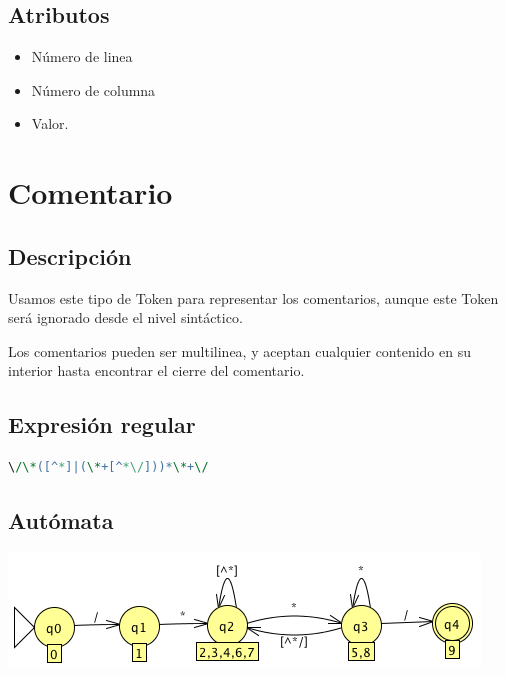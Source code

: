         \subsection{Atributos}
        
            \begin{itemize}
                \item Número de linea
                \item Número de columna
                \item Valor.
            \end{itemize}
            
            \hfill
            \clearpage
            
     
    
    \section{Comentario}
    
        \subsection{Descripción}
        
            Usamos este tipo de Token para representar los comentarios, aunque este Token será ignorado desde el nivel sintáctico.
            
            Los comentarios pueden ser multilinea, y aceptan cualquier contenido en su interior hasta encontrar el cierre del comentario.
        
        \subsection{Expresión regular}
            
             \begin{lstlisting}[language=Perl]
\/\*([^*]|(\*+[^*\/]))*\*+\/
             \end{lstlisting}
            
        \subsection{Autómata}
        
            \includegraphics[scale=.7]{../Design/jflap/Comentario.png}

